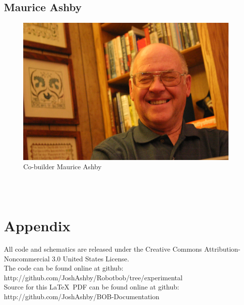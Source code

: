 \documentclass{article}
\begin{document}
\subsection{Maurice Ashby}
\begin{figure}[htp]
  \begin{center}
\includegraphics[scale=0.05]{maurice}
  \end{center}
  \caption{Co-builder Maurice Ashby}
\label{maurice}
\end{figure}\\
\\

\newpage
\section{Appendix}
All code and schematics are released under the Creative Commons Attribution-Noncommercial 3.0 United States License.\\
The code can be found online at github: http://github.com/JoshAshby/Robotbob/tree/experimental\\
Source for this \LaTeX ~{}PDF can be found online at github: http://github.com/JoshAshby/BOB-Documentation\\








\end{document}

